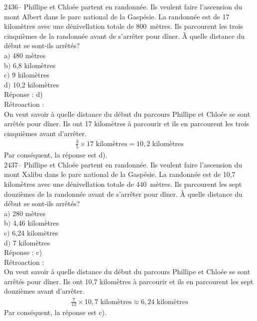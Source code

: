 \documentclass[letterpaper, 12pt]{article}
\begin{document}
2436--  Phillipe et Chlo\'ee partent en randonn\'ee. Ils veulent faire l'ascension du mont Albert dans le parc national de la Gasp\'esie. La randonn\'ee est de 17 kilom\`etres avec une d\'enivellation totale de \mbox{800 m\`etres}. Ils parcourent les trois cinqui\`emes de la randonn\'ee avant de s'arr\^eter pour d\^iner. \`A quelle distance du d\'ebut se sont-ils arr\^et\'es?\\

a$)$ 480 m\`etres\\
b$)$ 6,8 kilom\`etres\\
c$)$ 9 kilom\`etres\\
d$)$ 10,2 kilom\`etres\\

R\'eponse : d)\\

R\'etroaction :\\
On veut savoir \`a quelle distance du d\'ebut du parcours Phillipe et Chlo\'ee se sont arr\^et\'es pour d\^iner. Ils ont 17 kilom\`etres \`a parcourir et ils en parcourent les trois cinqui\`emes avant d'arr\^eter.
\begin{eqnarray*}
 \frac{3}{5}\times 17 \textrm{ kilom\`etres}=10,2 \textrm{ kilom\`etres}
\end{eqnarray*}
Par cons\'equent, la r\'eponse est d).\\

2437--  Phillipe et Chlo\'ee partent en randonn\'ee. Ils veulent faire l'ascension du mont Xalibu dans le parc national de la Gasp\'esie. La randonn\'ee est de 10,7 kilom\`etres avec une d\'enivellation totale de \mbox{440 m\`etres}. Ils parcourent les sept douzi\`emes de la randonn\'ee avant de s'arr\^eter pour d\^iner. \`A quelle distance du d\'ebut se sont-ils arr\^et\'es?\\

a$)$ 280 m\`etres\\
b$)$ 4,46 kilom\`etres\\
c$)$ 6,24 kilom\`etres\\
d$)$ 7 kilom\`etres\\

R\'eponse : c)\\

R\'etroaction :\\
On veut savoir \`a quelle distance du d\'ebut du parcours Phillipe et Chlo\'ee se sont arr\^et\'es pour d\^iner. Ils ont 10,7 kilom\`etres \`a parcourir et ils en parcourent les sept douzi\`emes avant d'arr\^eter.
\begin{eqnarray*}
 \frac{7}{12}\times 10,7 \textrm{ kilom\`etres}\approx6,24 \textrm{ kilom\`etres}
\end{eqnarray*}
Par cons\'equent, la r\'eponse est c).\\
\end{document}
